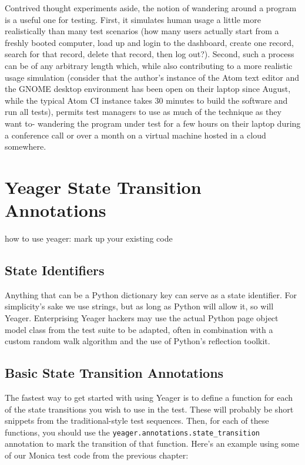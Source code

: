Contrived thought experiments aside, the notion of wandering around a program is a useful one for testing. First, it simulates human usage a little more realistically than many test scenarios (how many users actually start from a freshly booted computer, load up and login to the dashboard, create one record, search for that record, delete that record, then log out?). Second, such a process can be of any arbitrary length which, while also contributing to a more realistic usage simulation (consider that the author's instance of the Atom text editor and the GNOME desktop environment has been open on their laptop since August, while the typical Atom CI instance takes 30 minutes to build the software and run all tests\citep{CircleCI}), permits test managers to use as much of the technique as they want to- wandering the program under test for a few hours on their laptop during a conference call or over a month on a virtual machine hosted in a cloud somewhere.

\section{Yeager State Transition Annotations}
how to use yeager: mark up your existing code %

\subsection{State Identifiers}
Anything that can be a Python dictionary key can serve as a state identifier. For simplicity's sake we use strings, but as long as Python will allow it, so will Yeager. Enterprising Yeager hackers may use the actual Python page object model class from the test suite to be adapted, often in combination with a custom random walk algorithm and the use of Python's reflection toolkit.%

\subsection{Basic State Transition Annotations}
The fastest way to get started with using Yeager is to define a function for each of the state transitions you wish to use in the test. These will probably be short snippets from the traditional-style test sequences. Then, for each of these functions, you should use the \texttt{yeager.annotations.state\_transition} annotation to mark the transition of that function. Here's an example using some of our Monica test code from the previous chapter:

